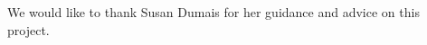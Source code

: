 \documentclass[sigchi]{acmart} %
\begin{document}
%
\begin{acks}
We would like to thank Susan Dumais for her guidance and advice on this project.
\end{acks}

%



% 
\end{document}

